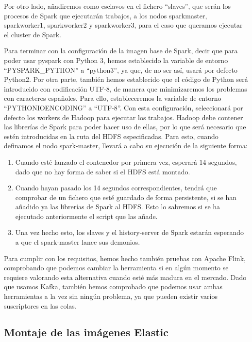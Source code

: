 Por otro lado, añadiremos como esclavos en el fichero “slaves”, que serán los procesos de Spark que ejecutarán trabajos, a los nodos sparkmaster, sparkworker1, sparkworker2 y sparkworker3, para el caso que queramos ejecutar el cluster de Spark.

Para terminar con la configuración de la imagen base de Spark, decir que para poder usar pyspark con Python 3, hemos establecido la variable de entorno “PYSPARK\_PYTHON” a “python3”, ya que, de no ser así, usará por defecto Python2. Por otra parte, también hemos establecido que el código de Python será introducido con codificación UTF-8, de manera que minimizaremos los problemas con caracteres españoles. Para ello, estableceremos la variable de entorno “PYTHONIOENCODING” a “UTF-8”.
Con esta configuración, seleccionará por defecto los workers de Hadoop para ejecutar los trabajos. Hadoop debe contener las librerías de Spark para poder hacer uso de ellas, por lo que será necesario que estén introducidas en la ruta del HDFS especificadas. Para esto, cuando definamos el nodo spark-master, llevará a cabo su ejecución de la siguiente forma:
\begin{enumerate}
        \item Cuando esté lanzado el contenedor por primera vez, esperará 14 segundos, dado que no hay forma de saber si el HDFS está montado.
        \item Cuando hayan pasado los 14 segundos correspondientes, tendrá que comprobar de un fichero que esté guardado de forma persistente, si se han añadido ya las librerías de Spark al HDFS. Esto lo sabremos si se ha ejecutado anteriormente el script que las añade.
        \item Una vez hecho esto, los slaves y el history-server de Spark estarán esperando a que el spark-master lance sus demonios.
\end{enumerate}
Para cumplir con los requisitos, hemos hecho también pruebas con Apache Flink, comprobando que podemos cambiar la herramienta si en algún momento se requiere valorando esta alternativa cuando esté más madura en el mercado. Dado que usamos Kafka, también hemos comprobado que podemos usar ambas herramientas a la vez sin ningún problema, ya que pueden existir varios suscriptores en las colas.



\subsection {Montaje de las imágenes Elastic\label{montElastic}}

